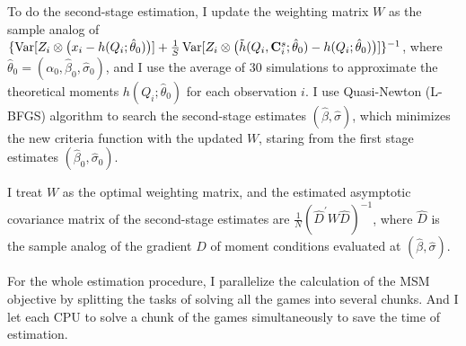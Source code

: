 To do the second-stage estimation, I update the weighting matrix $W$ as the
sample analog of $\{\operatorname{Var}[ Z_i \otimes \big(x_i -
        h(Q_i; \hat{\theta}_0)\big)] +
    \frac{1}{S}\operatorname{Var}[ Z_i \otimes \big(\tilde{h}(Q_i, \mathbf{C}^{s}_{i}; \hat{\theta}_0) -
        h(Q_i; \hat{\theta}_0)\big)]\}^{-1}$, where
$\hat{\theta}_0 = (\alpha_0, \hat{\beta}_0, \hat{\sigma}_0)$, and I use the average of 30
simulations to approximate the theoretical moments
$h(Q_i; \hat{\theta}_0)$ for each observation $i$.
I use Quasi-Newton (L-BFGS) algorithm to search the second-stage estimates $(\hat{\beta}, \hat{\sigma})$,
which minimizes the new criteria function with the updated $W$,
staring from the first stage estimates $(\hat{\beta}_0, \hat{\sigma}_0)$.

I treat $W$ as the optimal weighting matrix,
and the estimated asymptotic covariance matrix of the second-stage estimates
are $\frac{1}{N} (\hat{D}^{'}W\hat{D})^{-1}$, where $\hat{D}$ is the sample analog
of the gradient $D$
of moment conditions evaluated at $(\hat{\beta}, \hat{\sigma})$.


For the whole estimation procedure, I parallelize the calculation of the MSM objective
by splitting the tasks of solving all the games into several chunks. And I let each CPU
to solve a chunk of the games simultaneously to save the time of estimation.
